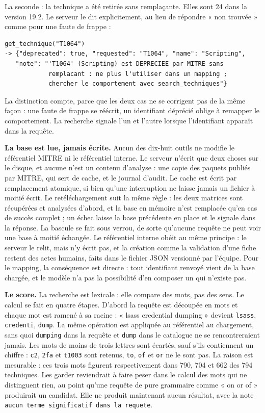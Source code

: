 La seconde : la technique a été retirée sans remplaçante. Elles sont 24 dans la version 19.2. Le serveur le dit explicitement, au lieu de répondre « non trouvée » comme pour une faute de frappe :

\begin{verbatim}
get_technique("T1064")
-> {"deprecated": true, "requested": "T1064", "name": "Scripting",
   "note": "'T1064' (Scripting) est DEPRECIEE par MITRE sans
            remplacant : ne plus l'utiliser dans un mapping ;
            chercher le comportement avec search_techniques"}
\end{verbatim}

La distinction compte, parce que les deux cas ne se corrigent pas de la même façon : une faute de frappe se réécrit, un identifiant déprécié oblige à remapper le comportement. La recherche signale l'un et l'autre lorsque l'identifiant apparaît dans la requête.

\textbf{La base est lue, jamais écrite.} Aucun des dix-huit outils ne modifie le référentiel MITRE ni le référentiel interne. Le serveur n'écrit que deux choses sur le disque, et aucune n'est un contenu d'analyse : une copie des paquets publiés par MITRE, qui sert de cache, et le journal d'audit. Le cache est écrit par remplacement atomique, si bien qu'une interruption ne laisse jamais un fichier à moitié écrit. Le retéléchargement suit la même règle : les deux matrices sont récupérées et analysées d'abord, et la base en mémoire n'est remplacée qu'en cas de succès complet ; un échec laisse la base précédente en place et le signale dans la réponse. La bascule se fait sous verrou, de sorte qu'aucune requête ne peut voir une base à moitié échangée. Le référentiel interne obéit au même principe : le serveur le relit, mais n'y écrit pas, et la création comme la validation d'une fiche restent des actes humains, faits dans le fichier JSON versionné par l'équipe. Pour le mapping, la conséquence est directe : tout identifiant renvoyé vient de la base chargée, et le modèle n'a pas la possibilité d'en composer un qui n'existe pas.

\textbf{Le score.} La recherche est lexicale : elle compare des mots, pas des sens. Le calcul se fait en quatre étapes. D'abord la requête est découpée en mots et chaque mot est ramené à sa racine : « lsass credential dumping » devient \texttt{lsass}, \texttt{credenti}, \texttt{dump}. La même opération est appliquée au référentiel au chargement, sans quoi \texttt{dumping} dans la requête et \texttt{dump} dans le catalogue ne se rencontreraient jamais. Les mots de moins de trois lettres sont écartés, sauf s'ils contiennent un chiffre : \texttt{c2}, \texttt{2fa} et \texttt{t1003} sont retenus, \texttt{to}, \texttt{of} et \texttt{or} ne le sont pas. La raison est mesurable : ces trois mots figurent respectivement dans 790, 704 et 662 des 794 techniques. Les garder reviendrait à faire peser dans le calcul des mots qui ne distinguent rien, au point qu'une requête de pure grammaire comme « on or of » produirait un candidat. Elle ne produit maintenant aucun résultat, avec la note \texttt{aucun\ terme\ significatif\ dans\ la\ requete}.

